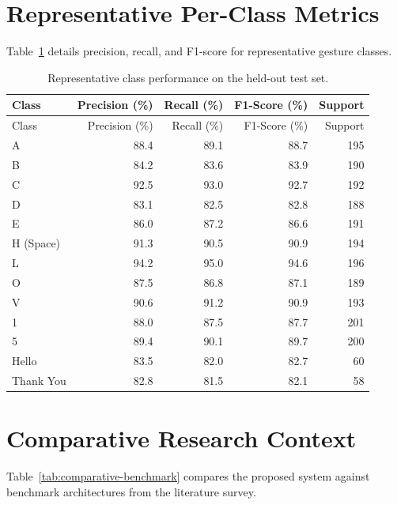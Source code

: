 \section{Representative Per-Class Metrics}
Table~\ref{tab:class-metrics} details precision, recall, and F1-score for representative gesture classes.

\begin{longtable}{lrrrr}
\caption{Representative class performance on the held-out test set.}\label{tab:class-metrics}\\
\toprule Class & Precision (\%) & Recall (\%) & F1-Score (\%) & Support\\\midrule
\endfirsthead
\toprule Class & Precision (\%) & Recall (\%) & F1-Score (\%) & Support\\\midrule
\endhead
\bottomrule
\endfoot
A & 88.4 & 89.1 & 88.7 & 195\\
B & 84.2 & 83.6 & 83.9 & 190\\
C & 92.5 & 93.0 & 92.7 & 192\\
D & 83.1 & 82.5 & 82.8 & 188\\
E & 86.0 & 87.2 & 86.6 & 191\\
H (Space) & 91.3 & 90.5 & 90.9 & 194\\
L & 94.2 & 95.0 & 94.6 & 196\\
O & 87.5 & 86.8 & 87.1 & 189\\
V & 90.6 & 91.2 & 90.9 & 193\\
1 & 88.0 & 87.5 & 87.7 & 201\\
5 & 89.4 & 90.1 & 89.7 & 200\\
Hello & 83.5 & 82.0 & 82.7 & 60\\
Thank You & 82.8 & 81.5 & 82.1 & 58\\
\end{longtable}

\section{Comparative Research Context}
Table~\ref{tab:comparative-benchmark} compares the proposed system against benchmark architectures from the literature survey.

